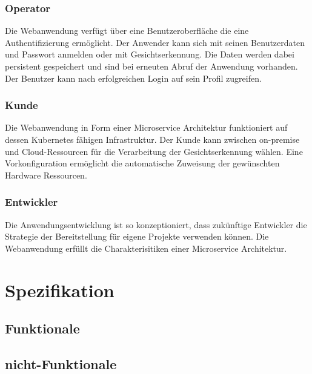 \subsubsection{Operator}
Die Webanwendung verfügt über eine Benutzeroberfläche die eine Authentifizierung ermöglicht.
Der Anwender kann sich mit seinen Benutzerdaten und Passwort anmelden oder mit Gesichtserkennung. 
Die Daten werden dabei persistent gespeichert und sind bei erneuten Abruf der Anwendung vorhanden. 
Der Benutzer kann nach erfolgreichen Login auf sein Profil zugreifen.

\subsubsection{Kunde}
Die Webanwendung in Form einer Microservice Architektur funktioniert auf dessen Kubernetes fähigen Infrastruktur. 
Der Kunde kann zwischen on-premise und Cloud-Ressourcen für die Verarbeitung der Gesichtserkennung wählen. 
Eine Vorkonfiguration ermöglicht die automatische Zuweisung der gewünschten Hardware Ressourcen.

\subsubsection{Entwickler}
Die Anwendungsentwicklung ist so konzeptioniert, dass zukünftige Entwickler die Strategie der Bereitstellung für eigene Projekte verwenden können.  
Die Webanwendung erfüllt die Charakterisitiken einer Microservice Architektur.

\section{Spezifikation}
\subsection{Funktionale}
\subsection{nicht-Funktionale}
